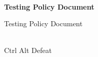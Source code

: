 \begin{titlepage}
    \centering



    \vspace{2cm}
    \hrulefill\\
    \vspace{1cm}
    {\Huge\bfseries Testing Policy Document}

    \vspace{1cm}

    {\Large Testing Policy Document}\\
    \vspace{1cm}
    \hrulefill\\

    \vfill

    {\large Ctrl Alt Defeat}

    \vspace{1cm}


\end{titlepage}